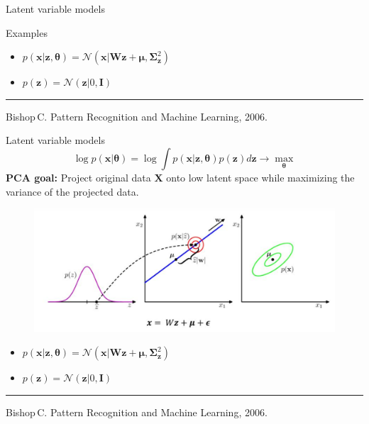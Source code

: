 \documentclass{beamer}
\newcommand{\bx}{\mathbf{x}}
\newcommand{\bz}{\mathbf{z}}
\newcommand{\bX}{\mathbf{X}}
\newcommand{\btheta}{\boldsymbol{\theta}}
\begin{document}
\begin{frame}{Latent variable models}
\begin{block}{Examples}
\begin{minipage}[t]{0.53\columnwidth}
\begin{figure}
		\end{figure}
		\vspace{-0.5cm}
		\begin{itemize}
	        \item $p(\bx | \bz, \btheta) = \mathcal{N}(\bx | \mathbf{W} \bz + \boldsymbol{\mu}, \boldsymbol{\Sigma}^2_\bz)$
	        \item $p(\bz) = \mathcal{N}(\bz | 0, \mathbf{I})$
	    \end{itemize}
	\end{minipage}
	\end{block}

\vfill
\hrule\medskip
{\scriptsize Bishop\,C. Pattern Recognition and Machine Learning, 2006.}
    
\end{frame}
\begin{frame}{Latent variable models}
    \[
    \log p(\bx | \btheta) = \log \int p(\bx | \bz, \btheta) p(\bz) d\bz \rightarrow \max_{\btheta}
    \]
	\textbf{PCA goal:} Project original data $\bX$ onto low latent space while maximizing the variance of the projected data. 
	\begin{figure}
		\centering
		\includegraphics[width=.7\linewidth]{figs/bayesian_pca.png}
	\end{figure}
	\vspace{-0.5cm}
	\begin{itemize}
        \item $p(\bx | \bz, \btheta) = \mathcal{N}(\bx | \mathbf{W} \bz + \boldsymbol{\mu}, \boldsymbol{\Sigma}^2_\bz)$
        \item $p(\bz) = \mathcal{N}(\bz | 0, \mathbf{I})$
    \end{itemize}

\vfill
\hrule\medskip
{\scriptsize Bishop\,C. Pattern Recognition and Machine Learning, 2006.}
    
\end{frame}
\end{document}
